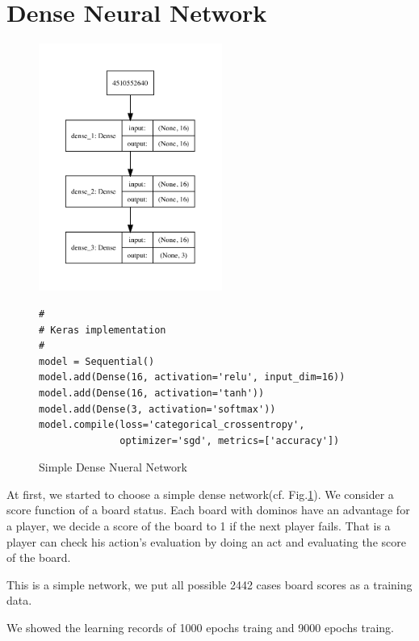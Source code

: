 \documentclass{article}
\begin{document}
\section{Dense Neural Network}

\begin{figure}
\begin{center}
\includegraphics[width=6cm]{../dump/model1.pdf}
\end{center}
\begin{verbatim}
#
# Keras implementation
#
model = Sequential()
model.add(Dense(16, activation='relu', input_dim=16))
model.add(Dense(16, activation='tanh'))
model.add(Dense(3, activation='softmax'))
model.compile(loss='categorical_crossentropy',
              optimizer='sgd', metrics=['accuracy'])
\end{verbatim}
\caption{Simple Dense Nueral Network}\label{fig:1}
\end{figure}

At first, we started to choose a simple dense network(cf. Fig.\ref{fig:1}).
We consider a score function of a board status.
Each board with dominos have an advantage for a player,
we decide a score of the board to 1 if the next player fails.
That is a player can check his action's evaluation
by doing an act and evaluating the score of the board.

This is a simple network, we put all possible 2442 cases 
board scores as a training data.

We showed the learning records of 1000 epochs traing
and 9000 epochs traing.
\end{document}
